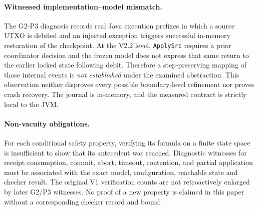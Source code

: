 \paragraph{Witnessed implementation--model mismatch.}
The G2-P3 diagnosis records real Java execution prefixes in which a source
UTXO is debited and an injected exception triggers successful in-memory
restoration of the checkpoint. At the V2.2 level, \texttt{ApplySrc} requires
a prior coordinator decision and the frozen model does not express that
same return to the earlier locked state following debit. Therefore a
step-preserving mapping of those internal events is \emph{not established}
under the examined abstraction. This observation neither disproves every
possible boundary-level refinement nor proves crash recovery. The journal
is in-memory, and the measured contract is strictly local to the JVM.

\paragraph{Non-vacuity obligations.}
For each conditional safety property, verifying its formula on a finite
state space is insufficient to show that its antecedent was reached.
Diagnostic witnesses for receipt consumption, commit, abort, timeout,
contention, and partial application must be associated with the exact model,
configuration, reachable state and checker result. The original V1
verification counts are not retroactively enlarged by later G2/P3 witnesses.
No proof of a new property is claimed in this paper without a corresponding
checker record and bound.

